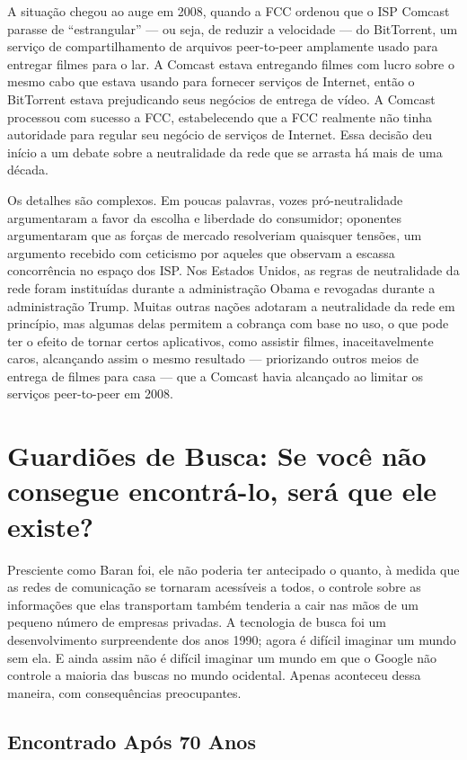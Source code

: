 A situação chegou ao auge em 2008, quando a FCC ordenou que o ISP Comcast parasse de
``estrangular'' --- ou seja, de reduzir a velocidade --- do BitTorrent, um serviço de
compartilhamento de arquivos peer-to-peer amplamente usado para entregar filmes para o lar.
A Comcast estava entregando filmes com lucro sobre o mesmo cabo que estava usando para
fornecer serviços de Internet, então o BitTorrent estava prejudicando seus negócios de entrega
de vídeo. A Comcast processou com sucesso a FCC, estabelecendo que a FCC realmente não tinha
autoridade para regular seu negócio de serviços de Internet. Essa decisão deu início a um
debate sobre a neutralidade da rede que se arrasta há mais de uma década.

Os detalhes são complexos. Em poucas palavras, vozes pró-neutralidade argumentaram a favor
da escolha e liberdade do consumidor; oponentes argumentaram que as forças de mercado
resolveriam quaisquer tensões, um argumento recebido com ceticismo por aqueles que observam
a escassa concorrência no espaço dos ISP. Nos Estados Unidos, as regras de neutralidade da
rede foram instituídas durante a administração Obama e revogadas durante a administração
Trump. Muitas outras nações adotaram a neutralidade da rede em princípio, mas algumas delas
permitem a cobrança com base no uso, o que pode ter o efeito de tornar certos aplicativos,
como assistir filmes, inaceitavelmente caros, alcançando assim o mesmo resultado ---
priorizando outros meios de entrega de filmes para casa --- que a Comcast havia alcançado ao
limitar os serviços peer-to-peer em 2008.

\section{Guardiões de Busca: Se você não consegue encontrá-lo, será que ele existe?}
\label{gatekeepers:guardioes-busca}

Presciente como Baran foi, ele não poderia ter antecipado o quanto, à medida que as redes de
comunicação se tornaram acessíveis a todos, o controle sobre as informações que elas
transportam também tenderia a cair nas mãos de um pequeno número de empresas privadas. A
tecnologia de busca foi um desenvolvimento surpreendente dos anos 1990; agora é difícil
imaginar um mundo sem ela. E ainda assim não é difícil imaginar um mundo em que o Google não
controle a maioria das buscas no mundo ocidental. Apenas aconteceu dessa maneira, com
consequências preocupantes.

\subsection{Encontrado Após 70 Anos}
\label{gatekeepers:encontrado}

